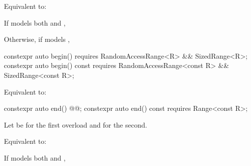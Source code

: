 {\begin{itemdescr}
\pnum
\effects
Equivalent to:
\begin{itemize}
{\color{newclr}
\item If  models both
 and ,

\item Otherwise, if  models ,
} %

\item {} 
\end{itemize}
\end{itemdescr}

{\color{oldclr}
%
\begin{itemdecl}
constexpr auto begin() requires RandomAccessRange<R> && SizedRange<R>;
constexpr auto begin() const
  requires RandomAccessRange<const R> && SizedRange<const R>;
\end{itemdecl}

\begin{itemdescr}
\pnum
\effects Equivalent to: 
\end{itemdescr}
} %

%
\begin{itemdecl}
constexpr auto end() @@;
constexpr auto end() const requires Range<const R>;
\end{itemdecl}

\begin{itemdescr}
{\color{newclr}
\pnum
Let  be  for the first overload and  for the
second.
} %

\pnum
\effects
Equivalent to:
 \\ 

\begin{itemize}
{\color{newclr}
\item If  models both
 and ,

}
\end{itemize}
\end{itemdescr}}
